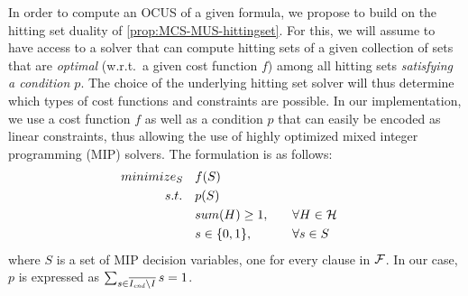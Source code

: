 In order to compute an OCUS of a given formula, we propose to build on the hitting set duality of \cref{prop:MCS-MUS-hittingset}. 
For this, we will assume to have access to a solver \cohs that can compute hitting sets of a given collection of sets that are \emph{optimal} (w.r.t.\ a given cost function $f$) among all hitting sets \emph{satisfying a condition $p$}. 
The choice of the underlying hitting set solver will thus determine which types of cost functions and constraints are possible. 
In our implementation, we use a cost function $f$ as well as a condition $p$ that can easily be encoded as linear constraints, thus allowing the use of highly optimized mixed integer programming (MIP) solvers. The \cohs formulation is as follows:
\begin{align*}
\small
  minimize_S \quad & f(S) \\ 
  s.t. \quad & p(S) \\
       & sum(H) \geq 1, \quad &&\forall H \in \setstohit \\
       & s \in \{0,1\}, \quad &&\forall s \in S
\end{align*}
where $S$ is a set of MIP decision variables, one for every clause in $\mathcal{F} $. In our case, $p$ is expressed as $\sum_{s \in \overline{I_\mathit{end} \setminus I}} s = 1$. 
